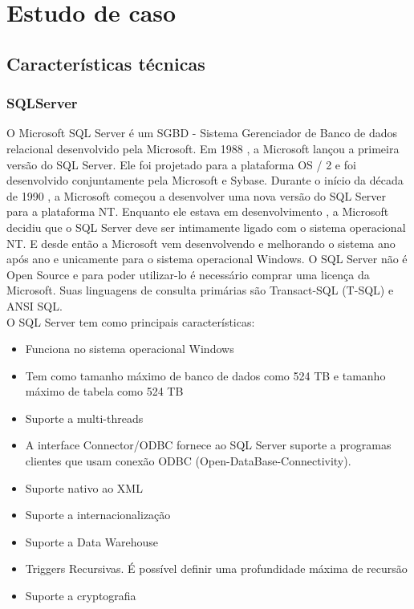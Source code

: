 \documentclass[conference]{IEEEtran}
\begin{document}
\section{Estudo de caso}
  \subsection{Características técnicas}
    \subsubsection{SQLServer }
    O Microsoft SQL Server é um SGBD - Sistema Gerenciador de Banco de dados relacional desenvolvido pela Microsoft. Em 1988 , a Microsoft lançou a primeira versão do SQL Server. Ele foi projetado para a plataforma OS / 2 e foi desenvolvido conjuntamente pela Microsoft e Sybase. Durante o início da década de 1990 , a Microsoft começou a desenvolver uma nova versão do SQL Server para a plataforma NT. Enquanto ele estava em desenvolvimento , a Microsoft decidiu que o SQL Server deve ser intimamente ligado com o sistema operacional NT. E desde então a Microsoft vem desenvolvendo e melhorando o sistema ano após ano e unicamente para o sistema operacional Windows. O SQL Server não é Open Source e para poder utilizar-lo é necessário comprar uma licença da Microsoft. Suas linguagens de consulta primárias são Transact-SQL (T-SQL) e ANSI SQL.\cite{sql-server-site} \cite{sql-server-site2}\\
    
    O SQL Server tem como principais características:
    \begin{itemize}
      \item Funciona no sistema operacional Windows
      \item Tem como tamanho máximo de banco de dados como 524 TB  e tamanho máximo de tabela como 524 TB
      \item Suporte a multi-threads
      \item A interface Connector/ODBC fornece ao SQL Server suporte a programas clientes que usam conexão ODBC (Open-DataBase-Connectivity).
      \item Suporte nativo ao XML
      \item Suporte a internacionalização
      \item Suporte a Data Warehouse
      \item Triggers Recursivas. É possível definir uma profundidade máxima de recursão
      \item Suporte a cryptografia
    \end{itemize}
\end{document}
